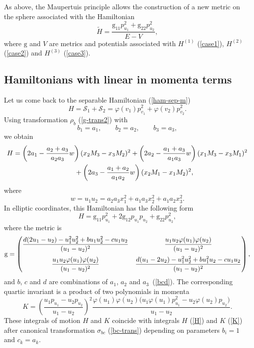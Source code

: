 \documentclass[pdftex]{sigma}
\numberwithin{equation}{section}
\begin{document}
As above, the Maupertuis principle allows the construction of a new metric on the sphere associated with the Hamiltonian
\[
\widetilde{H}=\frac{\mathrm g_{11}p^2_{u_1}+\mathrm g_{22}p^2_{u_2}}{E-V},
\]
where $\mathrm g$ and $V$ are metrics and potentials associated with $H^{(1)}$ (\ref{case1}), $H^{(2)}$ (\ref{case2}) and $H^{(3)}$ (\ref{case3}).

\subsection{Hamiltonians with linear in momenta terms}
Let us come back to the separable Hamiltonian (\ref{ham-sep-m})
\[
H=\mathcal{S}_1+\mathcal{S}_2=\varphi(v_1)p_{v_1}^2+\varphi(v_2)p_{v_2}^2 .
\]
 Using transformation $\rho_b$ (\ref{g-trans2}) with
\[b_1=a_1,\qquad b_2=a_2,\qquad b_3=a_3,\]
we obtain
\begin{gather*}
H= \left(2a_1 - \dfrac{a_2 + a_3}{a_2a_3} w\right)(x_2M_3-x_3M_2)^2
+\left(2a_2 -\dfrac{a_1 + a_3}{a_1a_3} w\right)(x_1M_3-x_3M_1)^2\\
\hphantom{H=}{} + \left(2a_3 -\dfrac{a_1 + a_2}{a_1a_2} w\right)(x_2M_1 -x_1M_2)^2 ,
\end{gather*}
where
\[
w=u_1u_2=a_2a_3x_1^2+a_1a_3x_2^2+a_1a_2x_3^2 .
\]
In elliptic coordinates, this Hamiltonian has the following form
\begin{equation}\label{b-h0}
H={\mathrm g}_{11}p_{u_1}^2+2{\mathrm g}_{12}p_{u_1}p_{u_2}+{\mathrm g}_{22}p_{u_2}^2 ,
\end{equation}
where the metric is
\[
{\mathrm g}=\left(
 \begin{matrix}
 \dfrac{d(2u_1 - u_2) - u_1^2u_2^2 + bu_1u_2^2 - cu_1u_2}{(u_1 - u_2)^2} & \dfrac{u_1u_2\varphi(u_1)\varphi(u_2)}{(u_1 - u_2)^2}\vspace{2mm} \\
 \dfrac{u_1u_2\varphi(u_1)\varphi(u_2)}{(u_1 - u_2)^2} &\dfrac{d(u_1 -2 u_2) - u_1^2u_2^2 + bu_1^2u_2 - cu_1u_2}{(u_1 - u_2)^2}
 \end{matrix}
 \right) ,
\]
and $b$, $c$ and $d$ are combinations of $a_1$, $a_2$ and $a_3$~(\ref{bcd}). The corresponding quartic invariant is a product of two polynomials in momenta
\begin{equation}\label{b-k0}
K=\left(\frac{u_1p_{u_1} -u_2p_{u_2} }{u_1 - u_2}\right)^2\frac{\varphi(u_1)\varphi(u_2)\big(u_1\varphi(u_1)p_{u_1}^2-u_2\varphi(u_2)p_{u_2}\big)}{u_1-u_2} .
\end{equation}
These integrals of motion $H$ and $K$ coincide with integrals $H$ (\ref{H}) and $K$ (\ref{K}) after canonical transformation $\sigma_{bc}$ (\ref{bc-trans}) depending on parameters $b_i=1$ and $c_k=a_k$.
\end{document}
